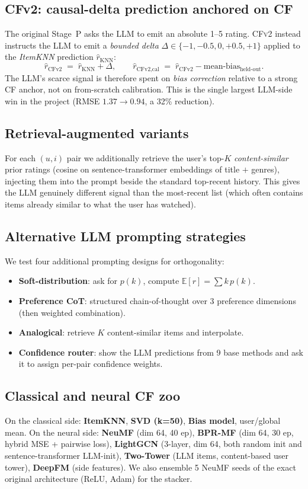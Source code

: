 \documentclass[11pt,a4paper]{article}
\begin{document}
\subsection{CFv2: causal-delta prediction anchored on CF}
The original Stage~P asks the LLM to emit an absolute 1--5 rating.
\textsc{CFv2} instead instructs the LLM to emit a \emph{bounded delta}
$\Delta \in \{-1, -0.5, 0, +0.5, +1\}$ applied to the \emph{ItemKNN}
prediction $\hat{r}_{\text{KNN}}$:
\[
  \hat{r}_{\text{CFv2}} \;=\; \hat{r}_{\text{KNN}} + \Delta,
  \qquad
  \hat{r}_{\text{CFv2,cal}} \;=\; \hat{r}_{\text{CFv2}} - \text{mean-bias}_{\text{held-out}}.
\]
The LLM's scarce signal is therefore spent on \emph{bias correction}
relative to a strong CF anchor, not on from-scratch calibration. This
is the single largest LLM-side win in the project
(RMSE $1.37 \to 0.94$, a 32\% reduction).

\subsection{Retrieval-augmented variants}
For each $(u,i)$ pair we additionally retrieve the user's top-$K$
\emph{content-similar} prior ratings (cosine on sentence-transformer
embeddings of title $+$ genres), injecting them into the prompt beside the
standard top-recent history. This gives the LLM genuinely different
signal than the most-recent list (which often contains items already
similar to what the user has watched).

\subsection{Alternative LLM prompting strategies}
We test four additional prompting designs for orthogonality:
\begin{itemize}[leftmargin=1.5em,itemsep=1pt]
\item \textbf{Soft-distribution}: ask for $p(k)$, compute
      $\mathbb{E}[r] = \sum k\,p(k)$.
\item \textbf{Preference CoT}: structured chain-of-thought over
      3 preference dimensions (then weighted combination).
\item \textbf{Analogical}: retrieve $K$ content-similar items and
      interpolate.
\item \textbf{Confidence router}: show the LLM predictions from 9
      base methods and ask it to assign per-pair confidence weights.
\end{itemize}

\subsection{Classical and neural CF zoo}
On the classical side: \textbf{ItemKNN}, \textbf{SVD (k=50)},
\textbf{Bias model}, user/global mean. On the neural side:
\textbf{NeuMF} (dim 64, 40 ep), \textbf{BPR-MF} (dim 64, 30 ep, hybrid
MSE + pairwise loss), \textbf{LightGCN} (3-layer, dim 64, both random
init and sentence-transformer LLM-init), \textbf{Two-Tower} (LLM items,
content-based user tower), \textbf{DeepFM} (side features). We also
ensemble 5 NeuMF seeds of the exact original architecture
(ReLU, Adam) for the stacker.
\end{document}
